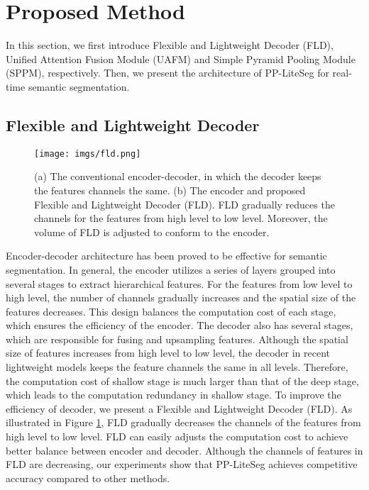 \documentclass[10pt,twocolumn,letterpaper]{article}
\begin{document}
\section{Proposed Method}
\label{sec:proposed_method}

In this section, we first introduce Flexible and Lightweight Decoder (FLD), Unified Attention Fusion Module (UAFM) and Simple Pyramid Pooling Module (SPPM), respectively. Then, we present the architecture of PP-LiteSeg for real-time semantic segmentation.

\subsection{Flexible and Lightweight Decoder}

\begin{figure}[t]
    \centering
    \texttt{[image: imgs/fld.png]}
    \caption{(a) The conventional encoder-decoder, in which the decoder keeps the features channels the same. (b) The encoder and proposed Flexible and Lightweight Decoder (FLD). FLD gradually reduces the channels for the features from high level to low level. Moreover, the volume of FLD is adjusted to conform to the encoder.}
    \label{fig:fld}
\end{figure}

Encoder-decoder architecture has been proved to be effective for semantic segmentation.
In general, the encoder utilizes a series of layers grouped into several stages to extract hierarchical features. For the features from low level to high level, the number of channels gradually increases and the spatial size of the features decreases. This design balances the computation cost of each stage, which ensures the efficiency of the encoder.
The decoder also has several stages, which are responsible for fusing and upsampling features.
Although the spatial size of features increases from high level to low level, the decoder in recent lightweight models keeps the feature channels the same in all levels. Therefore, the computation cost of shallow stage is much larger than that of the deep stage, which leads to the computation redundancy in shallow stage.
To improve the efficiency of decoder, we present a Flexible and Lightweight Decoder (FLD). 
As illustrated in Figure \ref{fig:fld}, FLD gradually decreases the channels of the features from high level to low level.
FLD can easily adjusts the computation cost to achieve better balance between encoder and decoder.
Although the channels of features in FLD are decreasing, our experiments show that PP-LiteSeg achieves competitive accuracy compared to other methods.
\end{document}

